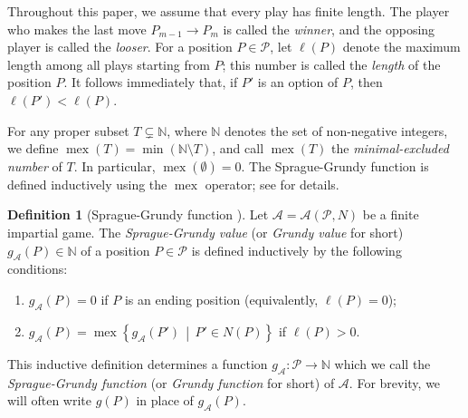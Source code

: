 \documentclass[a4paper,11pt]{amsart}
\theoremstyle{definition}
\newtheorem{dfn}{Definition}[section]
\newcommand{\mex}{\operatorname{mex}}
\numberwithin{equation}{section}
\def\Non{\mathbb{N}}
\def\P{\mathcal{P}}
\def\Game{\mathscr{A}}
\def\len#1{\ell\left({#1}\right)}
\begin{document}
Throughout this paper, we assume that every play has finite length.
The player who makes the last move $P_{m-1}\to P_{m}$ is called the \textsl{winner},
and the opposing player is called the \textsl{looser}.
For a position $P\in\P$, let $\len{P}$ denote the maximum length among all plays starting from $P$;
this number is called the \textsl{length} of the position $P$.
It follows immediately that, if $P'$ is an option of $P$, then $\len{P'}<\len{P}$.
%
\par\smallskip
%
For any proper subset $T\subsetneq \Non$,
where $\Non$ denotes the set of non-negative integers, we define
$\mex\left( T \right)=\min\left( \Non \setminus T \right)$,
and call $\mex\left( T \right)$ the \textsl{minimal-excluded number} of $T$.
In particular, $\mex( \emptyset ) = 0$.
%
The Sprague-Grundy function is defined inductively using the $\mex$ operator; see \cite{Grundy,Sprague} for details. 
%
\begin{dfn}[Sprague-Grundy function \cite{Grundy,Sprague}]\label{def:Grundy}
Let $\Game = \Game(\P, N)$ be a finite impartial game.
	The \textsl{Sprague-Grundy value} (or \textsl{Grundy value} for short) ${g}_{\Game}(P) \in \Non$ 
	of a position $P \in \P$ is defined inductively by the following conditions:
	\begin{enumerate}[label=(\roman*)] %
		\item\label{it:Grundy1}
			${g}_{\Game}(P) = 0$
			if $P$ is an ending position (equivalently, $\ell(P)=0$);
		\item\label{it:Grundy2}
			$
				{g}_{\Game}(P) 
				=
				\mex\left\{
					{g}_{\Game}(P')
				\, \middle| \,
					P' \in N(P)
				\right\}
			$
			if $\ell(P)>0$.
	\end{enumerate} %
\end{dfn}
This inductive definition determines a function $g_{\Game}:\P\to\Non$ which we call the \textsl{Sprague-Grundy function} (or \textsl{Grundy function} for short) of $\Game$.
For brevity, we will often write $g(P)$ in place of $g_{\Game}(P)$.
%
%
%
\end{document}
